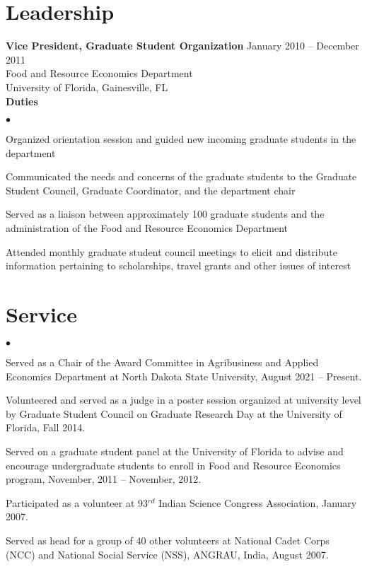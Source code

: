 \documentclass[margin,line]{res}
\newenvironment{list2}{
  \begin{list}{$\bullet$}{%
    \setlength{\itemsep}{0in}
    \setlength{\parsep}{0in} \setlength{\parskip}{0in}
    \setlength{\topsep}{0in} \setlength{\partopsep}{0in}
    \setlength{\leftmargin}{0.2in}}}{\end{list}}
\begin{document}
\begin{resume}
\section{\sc Leadership}
{\bf Vice President, Graduate Student Organization} \hfill{January 2010 -- December 2011} \\
Food and Resource Economics Department \\
University of Florida, Gainesville, FL\\
{\bf Duties}
\begin{list2}
\item Organized orientation session and guided new incoming graduate students in the department
\item Communicated the needs and concerns of the graduate students to the Graduate Student Council, Graduate Coordinator, and the department chair
\item Served as a liaison between approximately 100 graduate students and the administration of the Food and Resource Economics Department
\item Attended monthly graduate student council meetings to elicit and distribute information pertaining to scholarships, travel grants and other issues of interest
\end{list2}


\section{\sc Service}
\begin{list2}
\item Served as a Chair of the Award Committee in Agribusiness and Applied Economics Department at North Dakota State University, August 2021 -- Present.
\item Volunteered and served as a judge in a poster session organized at university level by Graduate Student Council on Graduate Research Day at the University of Florida, Fall 2014.
\item Served on a graduate student panel at the University of Florida to advise and encourage undergraduate students to enroll in Food and Resource Economics program, November, 2011 -- November, 2012.
\item Participated as a volunteer at 93$^{rd}$ Indian Science Congress Association, January 2007.
\item Served as head for a group of 40 other volunteers at National Cadet Corps (NCC) and National Social Service (NSS), ANGRAU, India, August 2007.
\end{list2}



\end{resume}
\end{document}
